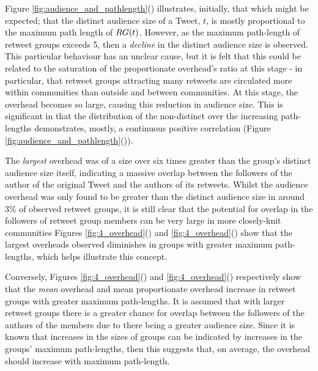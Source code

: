 Figure \ref{fig:audience_and_pathlength}() illustrates, initially, that which might be expected; that the distinct audience size of a Tweet, $t$, is mostly proportional to the maximum path length of $RG(t)$. However, as the maximum path-length of retweet groups exceeds 5, then a \textit{decline} in the distinct audience size is observed. This particular behaviour has an unclear cause, but it is felt that this could be related to the saturation of the proportionate overhead's ratio at this stage - in particular, that retweet groups attracting many retweets are circulated more within communities than outside and between communities. At this stage, the overhead becomes so large, causing this reduction in audience size. This is significant in that the distribution of the non-distinct over the increasing path-lengths demonstrates, mostly, a continuous positive correlation (Figure \ref{fig:audience_and_pathlength}()).

 

The \textit{largest} overhead was of a size over six times greater than the group's distinct audience size itself, indicating a massive overlap between the followers of the author of the original Tweet and the authors of its retweets. Whilst the audience overhead was only found to be greater than the distinct audience size in around 3\% of observed retweet groups, it is still clear that the potential for overlap in the followers of retweet group members can be very large in more closely-knit communities Figures \ref{fig:4_overhead}() and \ref{fig:4_overhead}() show that the largest overheads observed diminishes in groups with greater maximum path-lengths, which helps illustrate this concept.

Conversely, Figures \ref{fig:4_overhead}() and \ref{fig:4_overhead}() respectively show that the \textit{mean} overhead and mean proportionate overhead increase in retweet groups with greater maximum path-lengths. It is assumed that with larger retweet groups there is a greater chance for overlap between the followers of the authors of the members due to there being a greater audience size. Since it is known that increases in the sizes of groups can be indicated by increases in the groups' maximum path-lengths, then this suggests that, on average, the overhead should increase with maximum path-length. 

